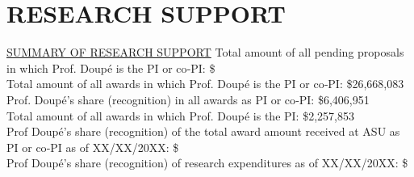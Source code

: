 \documentclass[11pt,letterpaper,sans]{moderncv}
\begin{document}



\section{RESEARCH SUPPORT}

\begin{framed}
  \underline{SUMMARY OF RESEARCH SUPPORT}
  Total amount of all pending proposals in which Prof. Doup\'e is the PI or co‐PI: \$ \\
  Total amount of all awards in which Prof. Doup\'e is the PI or co‐PI: \$26,668,083  \\
  Prof. Doup\'e's share (recognition) in all awards as PI or co‐PI: \$6,406,951  \\
  Total amount of all awards in which Prof. Doup\'e is the PI: \$2,257,853  \\
  Prof Doup\'e's share (recognition) of the total award amount received at ASU as PI or co‐PI as of XX/XX/20XX: \$ \\
  Prof Doup\'e's share (recognition) of research expenditures as of XX/XX/20XX: \$ \\
\end{framed}
\end{document}
